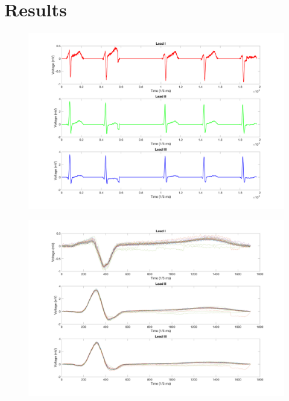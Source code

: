 \documentclass[12pt]{article}
\begin{document}
\section{Results}


\begin{figure}[H]
	
	\centering
	\includegraphics[width = .95\textwidth]{Figures/LimLeads1.png}
	\caption{ }
	\label{fig:Limb1}
\end{figure}

\begin{figure}[H]
	
	\centering
	\includegraphics[width = .95\textwidth]{Figures/LimLeads2.png}
	\caption{ }
	\label{fig:Limb2}
\end{figure}
\end{document}
